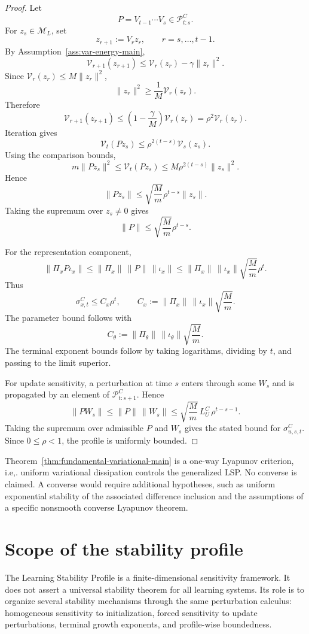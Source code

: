 \documentclass{article}
\numberwithin{equation}{section}
\begin{document}
\begin{proof}
Let
\[
P=V_{t-1}\cdots V_s\in\mathcal{P}_{t:s}^C .
\]
For \(z_s\in\mathcal{M}_L\), set
\[
z_{r+1}:=V_rz_r,
\qquad
r=s,\ldots,t-1 .
\]
By Assumption~\ref{ass:var-energy-main},
\[
\mathcal{V}_{r+1}(z_{r+1})
\le
\mathcal{V}_r(z_r)-\gamma\|z_r\|^2 .
\]
Since \(\mathcal{V}_r(z_r)\le M\|z_r\|^2\),
\[
\|z_r\|^2\ge \frac{1}{M}\mathcal{V}_r(z_r).
\]
Therefore
\[
\mathcal{V}_{r+1}(z_{r+1})
\le
\left(1-\frac{\gamma}{M}\right)\mathcal{V}_r(z_r)
=
\rho^2\mathcal{V}_r(z_r).
\]
Iteration gives
\[
\mathcal{V}_t(Pz_s)
\le
\rho^{2(t-s)}\mathcal{V}_s(z_s).
\]
Using the comparison bounds,
\[
m\|Pz_s\|^2
\le
\mathcal{V}_t(Pz_s)
\le
M\rho^{2(t-s)}\|z_s\|^2 .
\]
Hence
\[
\|Pz_s\|
\le
\sqrt{\frac{M}{m}}\rho^{t-s}\|z_s\|.
\]
Taking the supremum over \(z_s\ne0\) gives
\[
\|P\|
\le
\sqrt{\frac{M}{m}}\rho^{t-s}.
\]

For the representation component,
\[
\|\Pi_xP\iota_x\|
\le
\|\Pi_x\|\,\|P\|\,\|\iota_x\|
\le
\|\Pi_x\|\,\|\iota_x\|\sqrt{\frac{M}{m}}\rho^t .
\]
Thus
\[
\sigma_{x,t}^C\le C_x\rho^t,
\qquad
C_x:=\|\Pi_x\|\,\|\iota_x\|\sqrt{\frac{M}{m}} .
\]
The parameter bound follows with
\[
C_\theta:=\|\Pi_\theta\|\,\|\iota_\theta\|\sqrt{\frac{M}{m}} .
\]
The terminal exponent bounds follow by taking logarithms, dividing by \(t\),
and passing to the limit superior.

For update sensitivity, a perturbation at time \(s\) enters through some
\(W_s\) and is propagated by an element of \(\mathcal{P}_{t:s+1}^C\). Hence
\[
\|PW_s\|
\le
\|P\|\,\|W_s\|
\le
\sqrt{\frac{M}{m}}\,L_U^C\,\rho^{t-s-1}.
\]
Taking the supremum over admissible \(P\) and \(W_s\) gives the stated bound for
\(\sigma_{u,s,t}^C\). Since \(0\le\rho<1\), the profile is uniformly bounded.
\end{proof}

Theorem~\ref{thm:fundamental-variational-main} is a one-way Lyapunov criterion, i.e,. uniform variational dissipation controls the generalized LSP. No converse is claimed. A converse would require additional hypotheses, such as uniform exponential stability of the associated difference inclusion and the assumptions of a specific nonsmooth converse Lyapunov theorem.

\section{Scope of the stability profile}
\label{sec:scope-stability-profile}

The Learning Stability Profile is a finite-dimensional sensitivity framework. It does not assert a universal stability theorem for all learning systems. Its role is to organize several stability mechanisms through the same perturbation calculus: homogeneous sensitivity to initialization, forced sensitivity to update perturbations, terminal growth exponents, and profile-wise boundedness.
\end{document}
